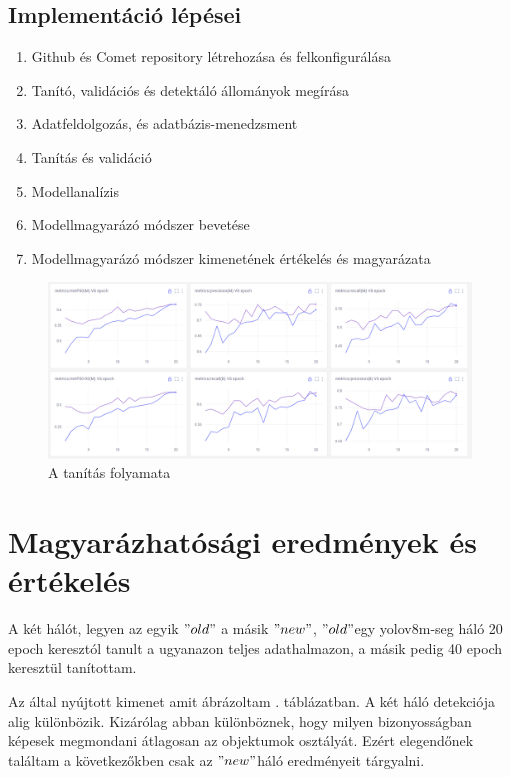\documentclass[12pt,oneside,a4paper]{article}
\newcommand{\newsection}[1]{\clearpage\section{#1}}\label{makro}
\theoremstyle{remark}
\newcommand{\oldh}{\( "old" \)}\label{makro2}
\newcommand{\newh}{\( "new" \)}
\begin{document}
	\subsection{Implementáció lépései}\label{subsec:impelemntacio}
	\begin{enumerate}
		\item Github és Comet repository létrehozása és felkonfigurálása
		\item Tanító, validációs és detektáló állományok megírása
		\item Adatfeldolgozás, és adatbázis-menedzsment
		\item Tanítás és validáció
		\item Modellanalízis
		\item Modellmagyarázó módszer bevetése
		\item Modellmagyarázó módszer kimenetének értékelés és magyarázata
	\end{enumerate}
	\begin{figure}[ht]
		\centering
		\includegraphics[width=1\linewidth]{modelltanitas}
		\caption{A tanítás folyamata}
		\label{fig:tanitas}
	\end{figure}
	
	\newsection{Magyarázhatósági eredmények és értékelés}\label{sec:magyarazhatosagi-eredmenyek-es-ertekeles}
	A két hálót, legyen az egyik \oldh\label{makrohasznalat} a másik \newh, \oldh egy yolov8m-seg háló 20
	\gls{epoch} keresztól tanult a ugyanazon teljes adathalmazon, a másik pedig 40 \gls{epoch} keresztül tanítottam.
	
	
	Az  által nyújtott kimenet amit ábrázoltam .
	táblázatban\label{hivatkozas}.
	A két háló detekciója alig különbözik.
	Kizárólag abban különböznek, hogy milyen bizonyosságban képesek megmondani átlagosan az objektumok osztályát.
	Ezért elegendőnek találtam a következőkben csak az \newh háló eredményeit tárgyalni.
	
\end{document}
